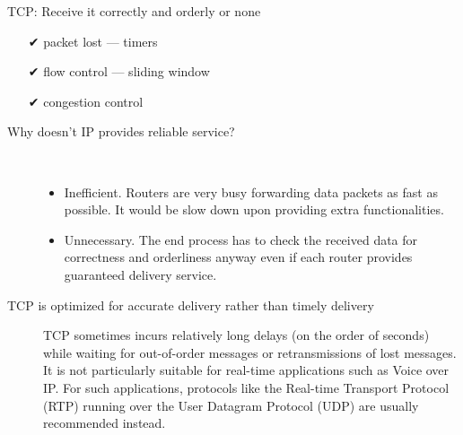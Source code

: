 \begin{frame}
\begin{minipage}[t]{.5\linewidth}
\begin{iblock}{TCP: Receive it correctly and orderly or none}
\begin{itemize}
      \item[{\dejavu ✔}] packet lost --- timers
      \item[{\dejavu ✔}] flow control --- sliding window
      \item[{\dejavu ✔}] congestion control
      \end{itemize}
    \end{iblock}
  \end{minipage}
\end{frame}

\begin{description}
\item[Why doesn't IP provides reliable service?]\,
  \begin{itemize}
  \item Inefficient. Routers are very busy forwarding data packets as fast as possible. It
    would be slow down upon providing extra functionalities.
  \item Unnecessary. The end process has to check the received data for correctness and
    orderliness anyway even if each router provides guaranteed delivery service.
  \end{itemize}
\item[TCP is optimized for accurate delivery rather than timely delivery] TCP sometimes
  incurs relatively long delays (on the order of seconds) while waiting for out-of-order
  messages or retransmissions of lost messages. It is not particularly suitable for
  real-time applications such as Voice over IP. For such applications, protocols like the
  Real-time Transport Protocol (RTP) running over the User Datagram Protocol (UDP) are
  usually recommended instead.
\end{description}

